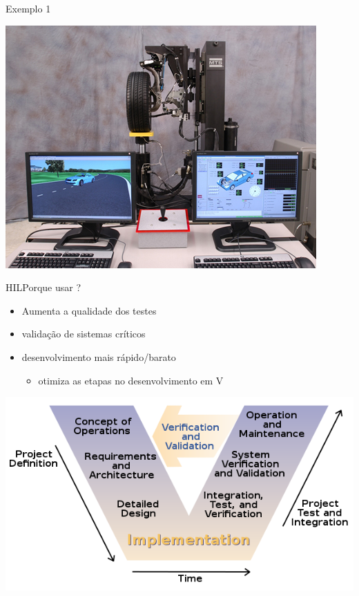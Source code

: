 \documentclass{beamer}
\begin{document}
\begin{frame}{Exemplo 1}
	\begin{center}
	\includegraphics[width=0.9\linewidth]{hil_example}
	\end{center}
\end{frame}

\begin{frame}{HIL}{Porque usar ?}
	\begin{itemize}
		\item Aumenta a qualidade dos testes
		\item validação de sistemas críticos
		\item desenvolvimento mais rápido/barato
			\begin{itemize}
					\item otimiza as etapas no desenvolvimento em V
			\end{itemize}
	\end{itemize} 
	
	\begin{center}
	\includegraphics[width=0.8\linewidth]{vmodel}
	\end{center}	
\end{frame}
\end{document}
